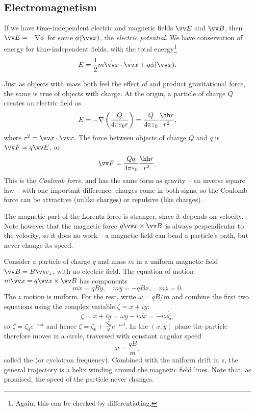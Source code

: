 \subsection{Electromagnetism}

If we have time-independent electric and magnetic fields $\vv E$ and $\vv B$, then $\vv E = - \nabla \phi$ for some $\phi(\vv x)$, the \emph{electric potential}. We have conservation of energy for time-independent fields, with the total energy\footnote{Again, this can be checked by differentiating.}
$$
E = \frac{1}{2}m \dot{\vv x} \cdot \dot{\vv x} + q \phi(\vv x). 
$$

Just as objects with mass both feel the effect of and product gravitational force, the same is true of objects with charge. At the origin, a particle of charge $Q$ creates an electric field as
$$
E = - \nabla \left(\frac{Q}{4 \pi \varepsilon_0 r}\right) = \frac{Q}{4 \pi \varepsilon_0} \frac{\hh r}{r^2},
$$
where $r^2 = \vv x \cdot \vv x$. The force between objects of charge $Q$ and $q$ is $\vv F = q \vv E$, or
$$
\vv F = \frac{Qq}{4 \pi \varepsilon_0} \frac{\hh r}{r^2}.
$$
This is the \emph{Coulomb force}, and has the same form as gravity -- an inverse square law -- with one important difference: charges come in both signs, so the Coulomb force can be attractive (unlike charges) or repulsive (like charges).

The magnetic part of the Lorentz force is stranger, since it depends on velocity. Note however that the magnetic force $q\dot{\vv x} \times \vv B$ is always perpendicular to the velocity, so it does no work -- a magnetic field can bend a particle's path, but never change its speed.

\begin{example}
	Consider a particle of charge $q$ and mass $m$ in a uniform magnetic field $\vv B = B \vv e_z$, with no electric field. The equation of motion $m\ddot{\vv x} = q \dot{\vv x} \times \vv B$ has components
	$$
	m \ddot{x} = q B\dot{y} , \quad m \ddot{y} = -qB \dot{x}, \quad m \ddot{z} = 0.
	$$
	The $z$ motion is uniform. For the rest, write $\omega = qB/m$ and combine the first two equations using the complex variable $\zeta = x + iy$:
	$$
	\ddot{\zeta} = \ddot x + i \ddot y = \omega \dot y - i \omega \dot x = -i\omega \dot{\zeta},
	$$
	so $\dot{\zeta} = \dot\zeta_0 e^{-i\omega t}$ and hence $\zeta = \zeta_0 + \frac{i\dot\zeta_0}{\omega}e^{-i \omega t}$. In the $(x, y)$ plane the particle therefore moves in a circle, traversed with constant angular speed
	$$
	\omega = \frac{qB}{m},
	$$
	called the  (or cyclotron frequency). Combined with the uniform drift in $z$, the general trajectory is a helix winding around the magnetic field lines. Note that, as promised, the speed of the particle never changes.
\end{example}


